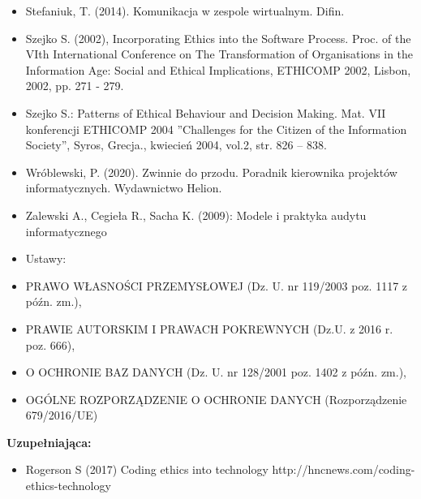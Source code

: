 \documentclass[12pt, a4paper]{article}
\begin{document}
\begin{itemize}
  \item Stefaniuk, T. (2014). Komunikacja w zespole wirtualnym. Difin.
  \item Szejko S. (2002), Incorporating Ethics into the Software Process. Proc. of the VIth International Conference on The Transformation of Organisations in the Information Age: Social and Ethical Implications, ETHICOMP 2002, Lisbon, 2002, pp. 271 - 279.
  \item Szejko S.: Patterns of Ethical Behaviour and Decision Making. Mat. VII konferencji ETHICOMP 2004 ''Challenges for the Citizen of the Information Society”, Syros, Grecja., kwiecień 2004, vol.2, str. 826 – 838.
  \item Wróblewski, P. (2020).  Zwinnie do przodu. Poradnik kierownika projektów informatycznych.  Wydawnictwo Helion.
  \item Zalewski A., Cegieła R., Sacha K. (2009): Modele i praktyka audytu informatycznego
  \item Ustawy:
  \item PRAWO WŁASNOŚCI PRZEMYSŁOWEJ (Dz. U. nr 119/2003 poz. 1117 z późn. zm.),
  \item PRAWIE AUTORSKIM I PRAWACH POKREWNYCH (Dz.U. z 2016 r. poz. 666),
  \item O OCHRONIE BAZ DANYCH (Dz. U. nr 128/2001 poz. 1402 z późn. zm.),
  \item OGÓLNE ROZPORZĄDZENIE O OCHRONIE DANYCH (Rozporządzenie 679/2016/UE)
\end{itemize}

\textbf{Uzupełniająca:}
\begin{itemize}
  \item Rogerson S (2017) Coding ethics into technology http://hncnews.com/coding-ethics-technology
\end{itemize}
\end{document}
